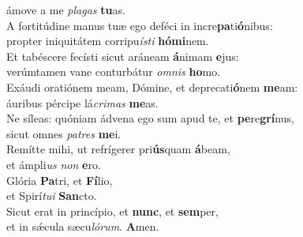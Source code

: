 \oddverse ámove a me \textit{pla}\textit{gas} \textbf{tu}as.\\
\evenverse A fortitúdine manus tuæ ego deféci in incre\textbf{pa}ti\textbf{ó}nibus:~\*\\
\evenverse propter iniquitátem corripu\textit{í}\textit{sti} \textbf{hó}\textbf{mi}nem.\\
\oddverse Et tabéscere fecísti sicut aráneam \textbf{á}nimam \textbf{e}jus:~\*\\
\oddverse verúmtamen vane conturbátur \textit{om}\textit{nis} \textbf{ho}mo.\\
\evenverse Exáudi oratiónem meam, Dómine, et deprecati\textbf{ó}nem \textbf{me}am:~\*\\
\evenverse áuribus pércipe lá\textit{cri}\textit{mas} \textbf{me}as.\\
\oddverse Ne síleas: quóniam ádvena ego sum apud te, et \textbf{pe}re\textbf{grí}nus,~\*\\
\oddverse sicut omnes \textit{pa}\textit{tres} \textbf{me}i.\\
\evenverse Remítte mihi, ut refrígerer pri\textbf{ús}quam \textbf{á}beam,~\*\\
\evenverse et ámpli\textit{us} \textit{non} \textbf{e}ro.\\
\oddverse Glória \textbf{Pa}tri, et \textbf{Fí}lio,~\*\\
\oddverse et Spirí\textit{tu}\textit{i} \textbf{San}cto.\\
\evenverse Sicut erat in princípio, et \textbf{nunc}, et \textbf{sem}per,~\*\\
\evenverse et in sǽcula sæcu\textit{ló}\textit{rum}. \textbf{A}men.\\

